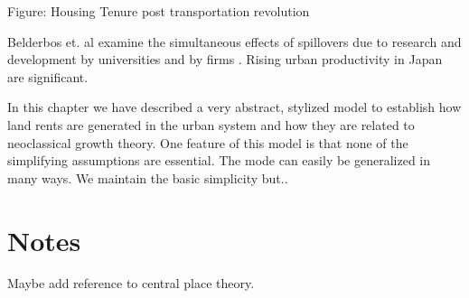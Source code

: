 \begin{center}

Figure: Housing Tenure post transportation revolution
\end{center}

Belderbos et. al examine the simultaneous effects of spillovers due to research and development by universities and by firms \cite{belderbosWhatSpilloversUniversities2022}. Rising urban productivity in Japan are significant. 





In this chapter we have described a very abstract, stylized model to establish how land rents are generated in the urban system and how they are related to neoclassical growth theory. One feature of this model is that none of the simplifying assumptions are essential. The mode can easily be generalized in many ways. We maintain the basic simplicity but..  


\section{Notes}
Maybe add reference to central place theory. %
